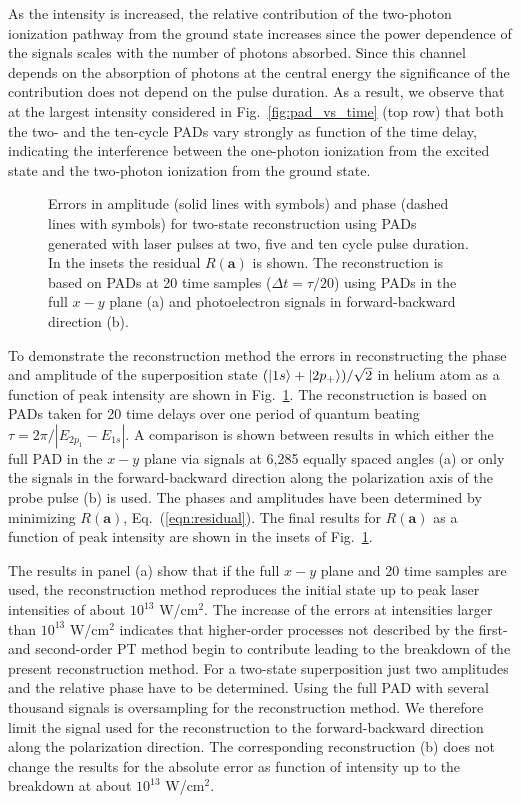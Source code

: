 As the intensity is increased, the relative contribution of the two-photon ionization pathway from the ground state increases since the power dependence of the signals scales with the number of photons absorbed. Since this channel depends on the absorption of photons at the central energy the significance of the contribution does not depend on the pulse duration. As a result, we observe that at the largest intensity considered in Fig.~\ref{fig:pad_vs_time} (top row) that both the two- and the ten-cycle PADs vary strongly as function of the time delay, indicating the interference between the one-photon ionization from the excited state and the two-photon ionization from the ground state.

\begin{figure}[t]
\centering
\caption{
Errors in amplitude (solid lines with symbols) and phase (dashed lines with symbols) for two-state reconstruction using PADs generated with laser pulses at two, five and ten cycle pulse duration. In the insets the residual $R(\mathbf{a})$ is shown. The reconstruction is based on PADs at 20 time samples ($\Delta t=\tau/20$) using PADs in the full $x-y$ plane (a) and photoelectron signals in forward-backward direction (b).
} 
  \label{fig:resonant}
\end{figure}

To demonstrate the reconstruction method the errors in reconstructing the phase and amplitude of the superposition state $(\ket{1s}+\ket{2p_+})/\sqrt{2}$ in helium atom as a function of peak intensity are shown in Fig.~\ref{fig:resonant}. The reconstruction is based on PADs taken for 20 time delays over one period of quantum beating $\tau = 2\pi / |E_{2p_1}-E_{1s}|$. A comparison is shown between results in which either the full PAD in the $x-y$ plane via signals at 6,285 equally spaced angles (a) or only the signals in the forward-backward direction along the polarization axis of the probe pulse (b) is used. The phases and amplitudes have been determined by minimizing $R(\mathbf{a})$, Eq.\ (\ref{eqn:residual}). The final results for $R(\mathbf{a})$ as a function of peak intensity are shown in the insets of Fig.~\ref{fig:resonant}.

The results in panel (a) show that if the full $x-y$ plane and 20 time samples are used, the reconstruction method reproduces the initial state up to peak laser intensities of about $10^{13}$ W/cm$^2$. The increase of the errors at intensities larger than $10^{13}$ W/cm$^2$ indicates that higher-order processes not described by the first- and second-order PT method begin to contribute leading to the breakdown of the present reconstruction method. For a two-state superposition just two amplitudes and the relative phase have to be determined. Using the full PAD with several thousand signals is oversampling for the reconstruction method. We therefore limit the signal used for the reconstruction to the forward-backward direction along the polarization direction. The corresponding reconstruction (b) does not change the results for the absolute error as function of intensity up to the breakdown at about $10^{13}$ W/cm$^2$.

